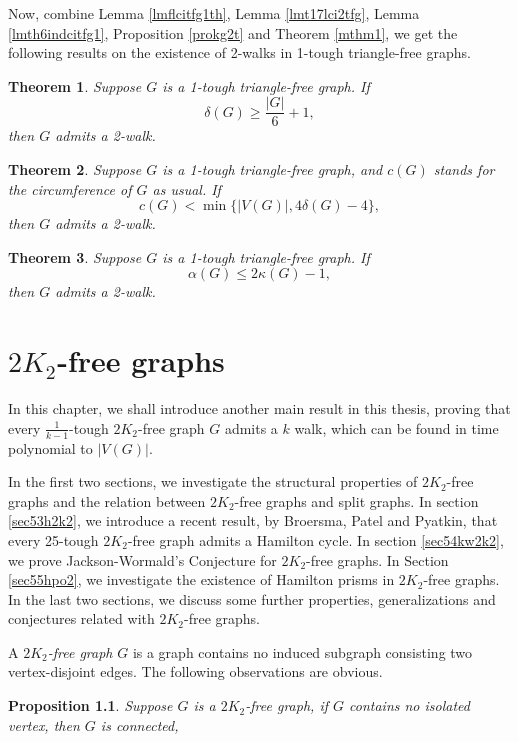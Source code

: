 \documentclass[12pt]{report}
\newtheorem{theorem}{Theorem}
\newtheorem{proposition}{Proposition}
\begin{document}
Now, combine Lemma \ref{lmflcitfg1th}, Lemma \ref{lmt17lci2tfg}, Lemma \ref{lmth6indcitfg1}, Proposition \ref{prokg2t} and Theorem \ref{mthm1}, we get the following results on the existence of 2-walks in 1-tough triangle-free graphs.

\begin{theorem}\label{co2wintfgdelg61}
Suppose $G$ is a 1-tough triangle-free graph. If $$\delta(G)\ge\frac{|G|}{6}+1,$$ then $G$ admits a 2-walk.
\end{theorem}

\begin{theorem}\label{co2wtfgcir}
Suppose $G$ is a 1-tough triangle-free graph, and $c(G)$ stands for the circumference of $G$ as usual. If $$c(G)<\min\{|V(G)|,4\delta(G)-4\},$$ then $G$ admits a 2-walk.
\end{theorem}

\begin{theorem}\label{co2wrfgalpka}
Suppose $G$ is a 1-tough triangle-free graph. If $$\alpha(G)\le2\kappa(G)-1,$$ then $G$ admits a 2-walk.
\end{theorem}















\chapter{$2K_2$-free graphs}\label{chap2k2fg}
In this chapter, we shall introduce another main result in this thesis, proving that every $\frac{1}{k-1}$-tough $2K_2$-free graph $G$ admits a $k$ walk, which can be found in time polynomial to $|V(G)|$.

In the first two sections, we investigate the structural properties of $2K_2$-free graphs and the relation between $2K_2$-free graphs and split graphs. In section \ref{sec53h2k2}, we introduce a recent result, by Broersma, Patel and Pyatkin, that every 25-tough $2K_2$-free graph admits a Hamilton cycle. In section \ref{sec54kw2k2}, we prove Jackson-Wormald's Conjecture for $2K_2$-free graphs. In Section \ref{sec55hpo2}, we investigate the existence of Hamilton prisms in $2K_2$-free graphs. In the last two sections, we discuss some further properties, generalizations and conjectures related with $2K_2$-free graphs.

A {\em $2K_2$-free graph} $G$ is a graph contains no induced subgraph consisting two vertex-disjoint edges. The following observations are obvious.
\begin{proposition}
Suppose $G$ is a $2K_2$-free graph, if $G$ contains no isolated vertex, then $G$ is connected,

\end{proposition}
\end{document}
